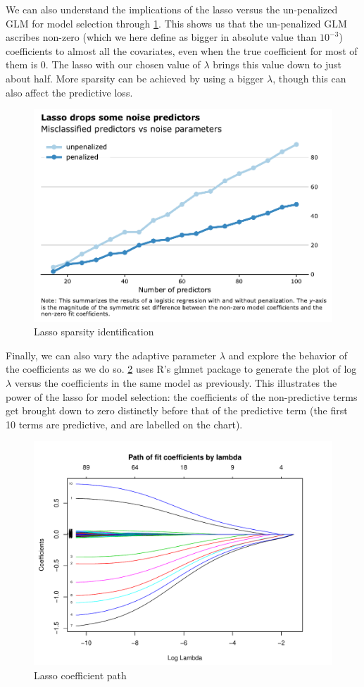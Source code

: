 \documentclass[letterpaper, 12pt]{article}
\begin{document}
We can also understand the implications of the lasso versus the un-penalized GLM
for model selection through \cref{fig:lasso-symm-diff}. This shows us that the
un-penalized GLM ascribes non-zero (which we here define as bigger in absolute
value than $10^{-3}$) coefficients to almost all the covariates, even when the
true coefficient for most of them is 0. The lasso with our chosen value of
$\lambda$ brings this value down to just about half. More sparsity can be
achieved by using a bigger $\lambda$, though this can also affect the predictive
loss.

\begin{figure}[h]
\centering
\includegraphics[width=.8\textwidth]{figs/lasso-symm-diff}
\caption{Lasso sparsity identification}
\label{fig:lasso-symm-diff}
\end{figure}

Finally, we can also vary the adaptive parameter $\lambda$ and explore the
behavior of the coefficients as we do so. \cref{fig:lasso-path} uses R's
\textsf{glmnet} package to generate the plot of log $\lambda$ versus the
coefficients in the same model as previously. This illustrates the power of the
lasso for model selection: the coefficients of the non-predictive terms get
brought down to zero distinctly before that of the predictive term (the first 10
terms are predictive, and are labelled on the chart).

\begin{figure}[h]
\centering
\includegraphics[width=.8\textwidth]{figs/lasso-path}
\caption{Lasso coefficient path}
\label{fig:lasso-path}
\end{figure}


\newpage


\end{document}
